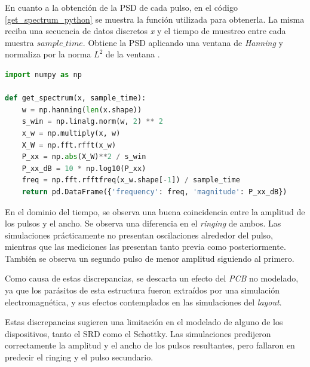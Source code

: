 En cuanto a la obtención de la PSD de cada pulso, en el código
\ref{get_spectrum_python} se muestra la función utilizada para obtenerla. La
misma reciba una secuencia de datos discretos \textit{x} y el tiempo de muestreo
entre cada muestra $sample\_time$. Obtiene la PSD aplicando una ventana de
\textit{Hanning} y normaliza por la norma $L^2$ de la
ventana \cite{oppenheim1999dsp}.

\begin{lstlisting}[language=Python, style=PythonStyle, caption=Función para obtener PSD,
label=get_spectrum_python, float]
import numpy as np

def get_spectrum(x, sample_time):
    w = np.hanning(len(x.shape))
    s_win = np.linalg.norm(w, 2) ** 2
    x_w = np.multiply(x, w)
    X_W = np.fft.rfft(x_w)
    P_xx = np.abs(X_W)**2 / s_win
    P_xx_dB = 10 * np.log10(P_xx)
    freq = np.fft.rfftfreq(x_w.shape[-1]) / sample_time
    return pd.DataFrame({'frequency': freq, 'magnitude': P_xx_dB})
\end{lstlisting}

En el dominio del tiempo, se observa una buena coincidencia entre la amplitud de
los pulsos y el ancho. Se observa una diferencia en el \textit{ringing} de
ambos.  Las simulaciones prácticamente no presentan oscilaciones alrededor del
pulso, mientras que las mediciones las presentan tanto previa como
posteriormente.  También se observa un segundo pulso de menor amplitud siguiendo
al primero.

Como causa de estas discrepancias, se descarta un efecto del \textit{PCB} no
modelado, ya que los parásitos de esta estructura fueron extraídos por una
simulación electromagnética, y sus efectos contemplados en las simulaciones del
\textit{layout}.

Estas  discrepancias sugieren una limitación en el modelado de alguno de los 
dispositivos, tanto el SRD como el Schottky. Las simulaciones predijeron correctamente
la amplitud y el ancho de los pulsos resultantes, pero fallaron en predecir 
el ringing y el pulso secundario.

